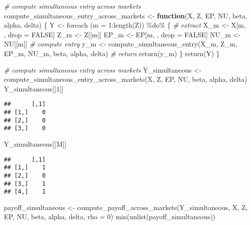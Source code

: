 \documentclass[
]{article}
\newenvironment{Shaded}{\begin{snugshade}}{\end{snugshade}}
\newcommand{\AttributeTok}[1]{\textcolor[rgb]{0.77,0.63,0.00}{#1}}
\newcommand{\CommentTok}[1]{\textcolor[rgb]{0.56,0.35,0.01}{\textit{#1}}}
\newcommand{\ConstantTok}[1]{\textcolor[rgb]{0.00,0.00,0.00}{#1}}
\newcommand{\ControlFlowTok}[1]{\textcolor[rgb]{0.13,0.29,0.53}{\textbf{#1}}}
\newcommand{\DecValTok}[1]{\textcolor[rgb]{0.00,0.00,0.81}{#1}}
\newcommand{\FunctionTok}[1]{\textcolor[rgb]{0.00,0.00,0.00}{#1}}
\newcommand{\NormalTok}[1]{#1}
\newcommand{\OtherTok}[1]{\textcolor[rgb]{0.56,0.35,0.01}{#1}}
\newcommand{\SpecialCharTok}[1]{\textcolor[rgb]{0.00,0.00,0.00}{#1}}
\begin{document}
\begin{Shaded}
\begin{Highlighting}[]
\CommentTok{\# compute simultaneous entry across markets}
\NormalTok{compute\_simultaneous\_entry\_across\_markets }\OtherTok{\textless{}{-}}
  \ControlFlowTok{function}\NormalTok{(X, Z, EP, NU, beta, alpha, delta) \{}
\NormalTok{    Y }\OtherTok{\textless{}{-}}
      \FunctionTok{foreach}\NormalTok{ (}\AttributeTok{m =} \DecValTok{1}\SpecialCharTok{:}\FunctionTok{length}\NormalTok{(Z)) }\SpecialCharTok{\%do\%}\NormalTok{ \{}
        \CommentTok{\# extract}
\NormalTok{        X\_m }\OtherTok{\textless{}{-}}\NormalTok{ X[m, , drop }\OtherTok{=} \ConstantTok{FALSE}\NormalTok{]}
\NormalTok{        Z\_m }\OtherTok{\textless{}{-}}\NormalTok{ Z[[m]]}
\NormalTok{        EP\_m }\OtherTok{\textless{}{-}}\NormalTok{ EP[m, , drop }\OtherTok{=} \ConstantTok{FALSE}\NormalTok{]}
\NormalTok{        NU\_m }\OtherTok{\textless{}{-}}\NormalTok{ NU[[m]]}
        \CommentTok{\# compute entry}
\NormalTok{        y\_m }\OtherTok{\textless{}{-}} \FunctionTok{compute\_simultaneous\_entry}\NormalTok{(X\_m, Z\_m, EP\_m, NU\_m, beta, alpha, delta)}
        \CommentTok{\# return}
        \FunctionTok{return}\NormalTok{(y\_m)}
\NormalTok{      \}}
    \FunctionTok{return}\NormalTok{(Y)}
\NormalTok{  \}}

\CommentTok{\# compute simultaneous entry across markets}
\NormalTok{Y\_simultaneous }\OtherTok{\textless{}{-}}
  \FunctionTok{compute\_simultaneous\_entry\_across\_markets}\NormalTok{(X, Z, EP, NU, beta, alpha, delta)}
\NormalTok{Y\_simultaneous[[}\DecValTok{1}\NormalTok{]]}
\end{Highlighting}
\end{Shaded}

\begin{verbatim}
##      [,1]
## [1,]    0
## [2,]    0
## [3,]    0
\end{verbatim}

\begin{Shaded}
\begin{Highlighting}[]
\NormalTok{Y\_simultaneous[[M]]}
\end{Highlighting}
\end{Shaded}

\begin{verbatim}
##      [,1]
## [1,]    1
## [2,]    0
## [3,]    1
## [4,]    1
\end{verbatim}

\begin{Shaded}
\begin{Highlighting}[]
\NormalTok{payoff\_simultaneous }\OtherTok{\textless{}{-}}
  \FunctionTok{compute\_payoff\_across\_markets}\NormalTok{(Y\_simultaneous, X, Z, EP, NU, beta, alpha, delta, }\AttributeTok{rho =} \DecValTok{0}\NormalTok{)}
\FunctionTok{min}\NormalTok{(}\FunctionTok{unlist}\NormalTok{(payoff\_simultaneous))}
\end{Highlighting}
\end{Shaded}
\end{document}
